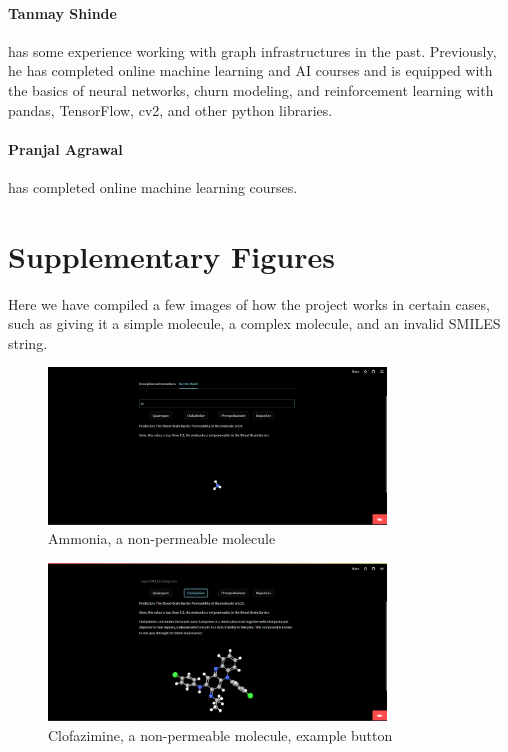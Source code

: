 \documentclass[fontsize=11pt]{article}
\begin{document}
\paragraph{Tanmay Shinde} has some experience working with graph infrastructures in the past. Previously, he has completed online machine learning and AI courses and is equipped with the basics of neural networks, churn modeling, and reinforcement learning with pandas, TensorFlow, cv2, and other python libraries. 

\paragraph{Pranjal Agrawal} has completed online machine learning courses.

\section*{Supplementary Figures}

Here we have compiled a few images of how the project works in certain cases, such as giving it a simple molecule, a complex molecule, and an invalid SMILES string.
\begin{figure}[h!]
    \centering
    \includegraphics[width=0.8\textwidth]{ammonia_simple.png}
    \caption{Ammonia, a non-permeable molecule}
    \label{fig:ammonia}
\end{figure}

\begin{figure}[h!]
    \centering
    \includegraphics[width=0.8\textwidth]{example_clofazimine.png}
    \caption{Clofazimine, a non-permeable molecule, example button}
    \label{fig:clofazimine}
\end{figure}
\end{document}
